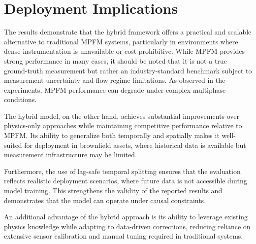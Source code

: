 \documentclass[12pt,APA]{uomthesis}
\begin{document}
\section{Deployment Implications}
The results demonstrate that the hybrid framework offers a practical and scalable alternative to traditional MPFM systems, particularly in environments where dense instrumentation is unavailable or cost-prohibitive. While MPFM provides strong performance in many cases, it should be noted that it is not a true ground-truth measurement but rather an industry-standard benchmark subject to measurement uncertainty and flow regime limitations. As observed in the experiments, MPFM performance can degrade under complex multiphase conditions.

The hybrid model, on the other hand, achieves substantial improvements over physics-only approaches while maintaining competitive performance relative to MPFM. Its ability to generalize both temporally and spatially makes it well-suited for deployment in brownfield assets, where historical data is available but measurement infrastructure may be limited.

Furthermore, the use of lag-safe temporal splitting ensures that the evaluation reflects realistic deployment scenarios, where future data is not accessible during model training. This strengthens the validity of the reported results and demonstrates that the model can operate under causal constraints.

An additional advantage of the hybrid approach is its ability to leverage existing physics knowledge while adapting to data-driven corrections, reducing reliance on extensive sensor calibration and manual tuning required in traditional systems.
\end{document}

